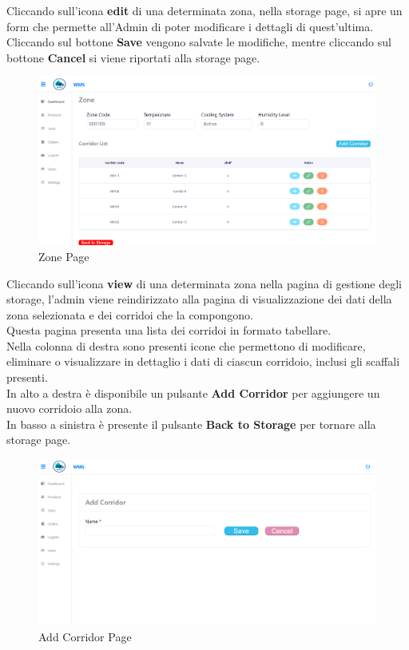 Cliccando sull'icona \textbf{edit} di una determinata zona, nella storage page, si apre un form
che permette all'Admin di poter modificare i dettagli di quest'ultima.\\
Cliccando sul bottone \textbf{Save} vengono salvate le modifiche, mentre cliccando sul bottone \textbf{Cancel} si viene
riportati alla storage page.

\begin{figure}[H]
    \centering
    \includegraphics[width=\textwidth]{document/sections/img/Storyboard/viewZone.png}
    \caption{Zone Page}
    \label{fig:zonePage}
\end{figure}

Cliccando sull'icona \textbf{view} di una determinata zona nella pagina di gestione degli storage, l’admin viene reindirizzato alla pagina di visualizzazione dei dati della zona selezionata e dei corridoi che la compongono.\\
Questa pagina presenta una lista dei corridoi in formato tabellare.\\
Nella colonna di destra sono presenti icone che permettono di modificare, eliminare o visualizzare in dettaglio i dati di ciascun corridoio, inclusi gli scaffali presenti.\\
In alto a destra è disponibile un pulsante \textbf{Add Corridor} per aggiungere un nuovo corridoio alla zona.\\
In basso a sinistra è presente il pulsante \textbf{Back to Storage} per tornare alla storage page.

\begin{figure}[H]
    \centering
    \includegraphics[width=\textwidth]{document/sections/img/Storyboard/addCorridorPage.png}
    \caption{Add Corridor Page}
    \label{fig:addCorridorPages}
\end{figure}

